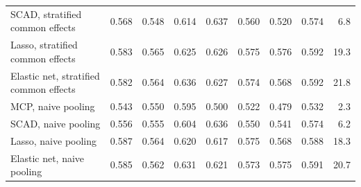 \begin{tabular}{@{}lrrrrrrrr@{}}
SCAD, stratified common effects & 0.568 & 0.548 & 0.614 & 0.637 & 0.560 & 0.520 & 0.574 & 6.8 \\
Lasso, stratified common effects & 0.583 & 0.565 & 0.625 & 0.626 & 0.575 & 0.576 & 0.592 & 19.3 \\
Elastic net, stratified common effects & 0.582 & 0.564 & 0.636 & 0.627 & 0.574 & 0.568 & 0.592 & 21.8 \\
MCP, naive pooling & 0.543 & 0.550 & 0.595 & 0.500 & 0.522 & 0.479 & 0.532 & 2.3 \\
SCAD, naive pooling & 0.556 & 0.555 & 0.604 & 0.636 & 0.550 & 0.541 & 0.574 & 6.2 \\
Lasso, naive pooling & 0.587 & 0.564 & 0.620 & 0.617 & 0.575 & 0.568 & 0.588 & 18.3 \\
Elastic net, naive pooling & 0.585 & 0.562 & 0.631 & 0.621 & 0.573 & 0.575 & 0.591 & 20.7 \\
\bottomrule
\end{tabular}
